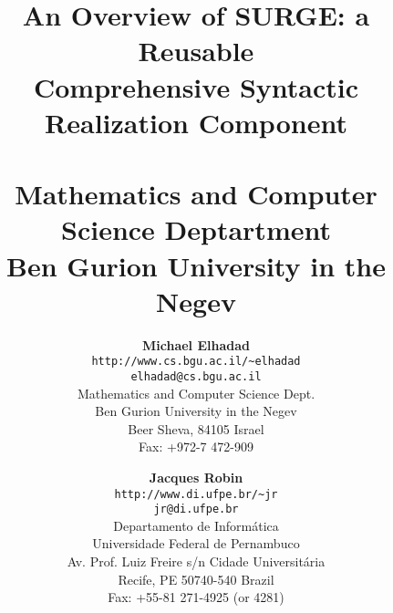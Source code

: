 

\topmargin 0pt
\headheight 0pt
\headsep 0pt
\textheight 9in
\textwidth 6.5in
\evensidemargin 0pt
\oddsidemargin 0pt
\marginparwidth 0pt
\marginparsep 0pt

\newenvironment{zitemize}%
{\parskip=0.25\parskip \begin{itemize} \itemsep=0.25\itemsep \parsep=0pt}%
{\end{itemize} \parskip = 4\parskip}

\newenvironment{zenumerate}%
{\parskip=0.25\parskip \begin{enumerate}\itemsep=0.25\itemsep\parsep=0pt}%
{\end{enumerate} \parskip = 4\parskip}

\newcommand{\m}[3]{\multicolumn{#1}{#2}{#3}}
\renewcommand{\topfraction}{.85}
\renewcommand{\textfraction}{.15}
\renewcommand{\bottomfraction}{.85}


\title{{\bf An Overview of SURGE: a Reusable\\ Comprehensive Syntactic
Realization Component}\\\vspace{.75cm}{\small Technical Report 96-03}\\
{\small Mathematics and Computer Science Deptartment}\\
{\small  Ben Gurion University in the Negev}} 
\vspace{1.25cm}
\author{{\bf Michael Elhadad}\\
{\small \tt http://www.cs.bgu.ac.il/\~{}elhadad}\\
{\small \tt elhadad@cs.bgu.ac.il}\\
{\small Mathematics and Computer Science Dept.}\\
{\small Ben Gurion University in the Negev}\\
{\small Beer Sheva, 84105 Israel}\\
{\small Fax: +972-7 472-909}
\and {\bf Jacques Robin}\\
{\small \tt http://www.di.ufpe.br/\~{}jr}\\
{\small \tt jr@di.ufpe.br}\\
{\small Departamento de Inform\'atica}\\
{\small Universidade Federal de Pernambuco}\\
{\small Av. Prof. Luiz Freire s/n Cidade Universit\'aria}\\
{\small Recife, PE 50740-540 Brazil}\\
{\small Fax: +55-81 271-4925 (or 4281)}
}

